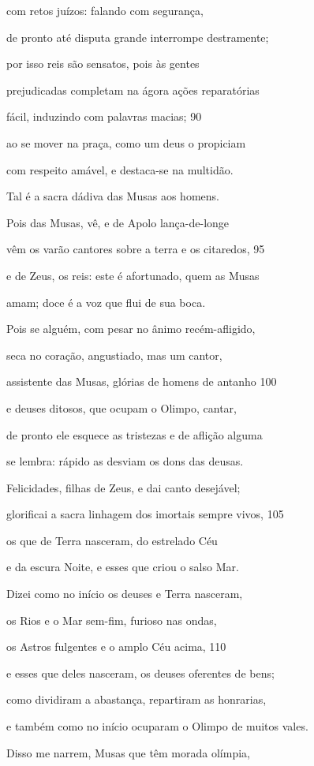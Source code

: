 com retos juízos: falando com segurança,

de pronto até disputa grande interrompe destramente;

por isso reis são sensatos, pois às gentes

prejudicadas completam na ágora ações reparatórias

fácil, induzindo com palavras macias; \num{90}

ao se mover na praça, como um deus o propiciam

com respeito amável, e destaca-se na multidão.

\quad{}Tal é a sacra dádiva das Musas aos homens.

Pois das Musas, vê, e de Apolo lança-de-longe

vêm os varão cantores sobre a terra e os citaredos, \num{95}

e de Zeus, os reis: este é afortunado, quem as Musas

amam; doce é a voz que flui de sua boca.

Pois se alguém, com pesar no ânimo recém-afligido,

seca no coração, angustiado, mas um cantor,

assistente das Musas, glórias de homens de antanho \num{100}

e deuses ditosos, que ocupam o Olimpo, cantar,

de pronto ele esquece as tristezas e de aflição alguma

se lembra: rápido as desviam os dons das deusas.

\quad{}Felicidades, filhas de Zeus, e dai canto desejável;

glorificai a sacra linhagem dos imortais sempre vivos, \num{105}

os que de Terra nasceram, do estrelado Céu

e da escura Noite, e esses que criou o salso Mar.

Dizei como no início os deuses e Terra nasceram,

os Rios e o Mar sem-fim, furioso nas ondas,

os Astros fulgentes e o amplo Céu acima, \num{110}

e esses que deles nasceram, os deuses oferentes de bens;

como dividiram a abastança, repartiram as honrarias,

e também como no início ocuparam o Olimpo de muitos vales.

Disso me narrem, Musas que têm morada olímpia,

